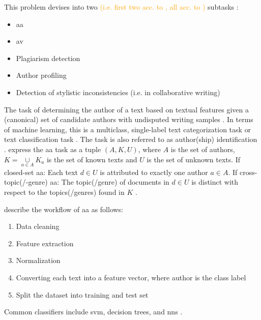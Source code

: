\begin{definition}
    This problem devises into two \textcolor{orange}{(i.e. first two acc. to \cite{stein_intrinsic_2011}, all acc. to \cite{stamatatos_survey_2009})} subtasks \cite{stein_intrinsic_2011}:
    \begin{itemize}
        \item \ac{aa} \cite{stein_intrinsic_2011}
        \item \ac{av} \cite{stein_intrinsic_2011,stamatatos_survey_2009}
        \item Plagiarism detection \cite{stamatatos_survey_2009}
        \item Author profiling \cite{stamatatos_survey_2009}
        \item Detection of stylistic inconsistencies (i.e. in collaborative writing) \cite{stamatatos_survey_2009}
    \end{itemize}
\end{definition}

\begin{definition}
    [\ac{aa}]   %
    The task of determining the author of a text based on textual features 
    given a (canonical) set of candidate authors with undisputed writing samples 
    \cite{stein_intrinsic_2011,stamatatos_survey_2009,tyo_state_2022,bischoff_importance_2020,barlas_cross_domain_2020,altakrori_topic_2021,bevendorff_divergence_based_2020,elmanarelbouanani_authorship_2014}.
    In terms of machine learning, this is a multiclass, single-label text categorization task \cite{stamatatos_survey_2009,elmanarelbouanani_authorship_2014} or text classification task \cite{elmanarelbouanani_authorship_2014}.
    The task is also referred to as author(ship) identification \cite{stamatatos_survey_2009,elmanarelbouanani_authorship_2014}.
    \citet{barlas_cross_domain_2020} express the \ac{aa} task as a tuple $(A,K,U)$, 
    where $A$ is the set of authors, $K=\underset{a\in A}{\cup}K_a$ is the set of known texts and $U$ is the set of unknown texts.
    If closed-set \ac{aa}: Each text $d \in U$ is attributed to exactly one author $a \in A$.
    If cross-topic(/-genre) \ac{aa}: The topic(/genre) of documents in $d \in U$ is distinct 
    with respect to the topics(/genres) found in $K$ \cite{barlas_cross_domain_2020}. 
\end{definition}

\citet{elmanarelbouanani_authorship_2014} describe the workflow of \ac{aa} as follows:
\begin{enumerate}
    \item Data cleaning
    \item Feature extraction
    \item Normalization
    \item Converting each text into a feature vector, where author is the class label
    \item Split the dataset into training and test set
\end{enumerate}
Common classifiers include \ac{svm}, decision trees, and \acp{nn} \cite{elmanarelbouanani_authorship_2014}.

